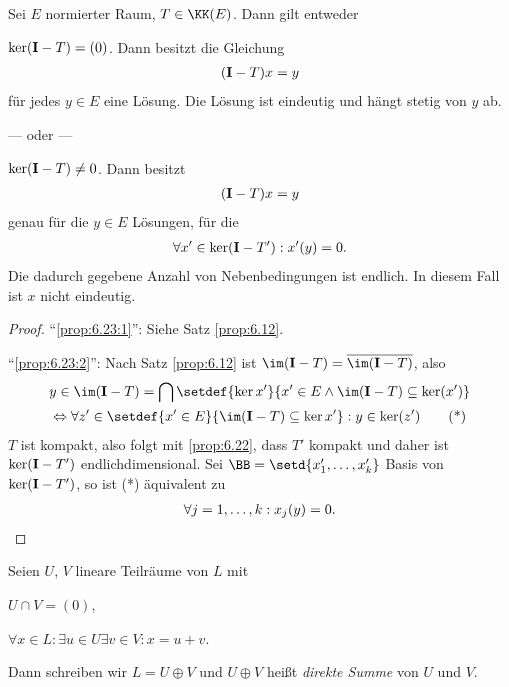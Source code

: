 \begin{prop}
\label{prop:6.23}
Sei $E$ normierter Raum, $T\in\KK(E)$. Dann gilt entweder
\begin{equivenum}
  \item\label{prop:6.23:1} $\ker (\mathbf{I}-T)=(0)$. Dann besitzt die Gleichung
\begin{align*}
(\mathbf{I} - T)x = y
\end{align*}
für jedes $y\in E$ eine Lösung. Die Lösung ist eindeutig und hängt stetig von
$y$ ab.

--- oder ---
\item\label{prop:6.23:2} $\ker(\mathbf{I}-T)\neq 0$. Dann besitzt 
\begin{align*}
(\mathbf{I}-T)x = y
\end{align*}
genau für die $y\in E$ Lösungen, für die
\begin{align*}
\forall x' \in \ker (\mathbf{I}-T') : x'(y) = 0.
\end{align*}
Die dadurch gegebene Anzahl von Nebenbedingungen ist endlich. In diesem Fall
ist $x$ nicht eindeutig.\fishhere
\end{equivenum}
\end{prop}
\begin{proof}
``\ref{prop:6.23:1}'': Siehe Satz \ref{prop:6.12}.

``\ref{prop:6.23:2}'': Nach Satz \ref{prop:6.12} ist $\im(\Id-T) =
\overline{\im(\Id-T)}$, also
\begin{align*}
&y\in \im(\Id-T) = \bigcap
\setdef{\ker x'}{x'\in E \land \im (\Id-T) \subseteq \ker (x')}\\
&\Leftrightarrow
\forall z'\in \setdef{x'\in E}{\im
(\Id-T)\subseteq \ker x'} : y\in \ker (z')\tag{*}
\end{align*}
$T$ ist kompakt, also folgt mit \ref{prop:6.22}, dass $T'$ kompakt und daher ist
$\ker(\mathbf{I}-T')$ endlichdimensional. Sei $\BB=\setd{x_1',\ldots,x_k'}$
Basis von $\ker(\mathbf{I}-T')$, so ist (*) äquivalent zu
\begin{align*}
\forall j=1,\ldots,k : x_j(y) = 0.\qedhere
\end{align*}
\end{proof}

\begin{defn}
\label{defn:6.24}
Seien $U$, $V$ lineare Teilräume von $L$ mit
\begin{defnenum}
\item $U\cap V = (0)$,
\item $\forall x\in L : \exists u\in U\exists v\in V : x = u+v$.
\end{defnenum}
Dann schreiben wir $L=U\oplus V$ und $U\oplus V$ heißt \emph{direkte
Summe} von $U$ und $V$.\fishhere
\end{defn}

